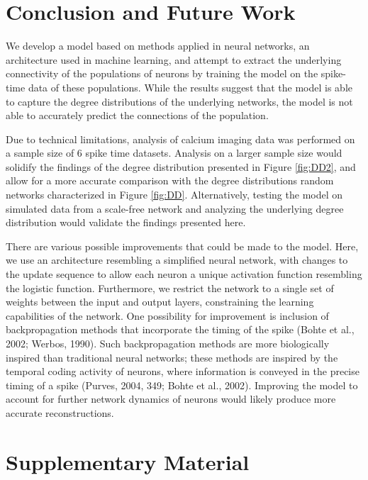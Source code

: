 \documentclass[11pt,titlepage]{article}
\begin{document}
\clearpage
\section{Conclusion and Future Work}
We develop a model based on methods applied in neural networks, an architecture used in machine learning, and attempt to extract the underlying connectivity of the populations of neurons by training the model on the spike-time data of these populations. While the results suggest that the model is able to capture the degree distributions of the underlying networks, the model is not able to accurately predict the connections of the population.\par
Due to technical limitations, analysis of calcium imaging data was performed on a sample size of 6 spike time datasets. Analysis on a larger sample size would solidify the findings of the degree distribution presented in Figure \ref{fig:DD2}, and allow for a more accurate comparison with the degree distributions random networks characterized in Figure \ref{fig:DD}. Alternatively, testing the model on simulated data from a scale-free network and analyzing the underlying degree distribution would validate the findings presented here.\par
	There are various possible improvements that could be made to the model. Here, we use an architecture resembling a simplified neural network, with changes to the update sequence to allow each neuron a unique activation function resembling the logistic function. Furthermore, we restrict the network to a single set of weights between the input and output layers, constraining the learning capabilities of the network. One possibility for improvement is inclusion of backpropagation methods that incorporate the timing of the spike (Bohte et al., 2002; Werbos, 1990). Such backpropagation methods are more biologically inspired than traditional neural networks; these methods are inspired by the temporal coding activity of neurons, where information is conveyed in the precise timing of a spike (Purves, 2004, 349; Bohte et al., 2002). Improving the model to account for further network dynamics of neurons would likely produce more accurate reconstructions.\par


\clearpage
\section{Supplementary Material}
\end{document}
